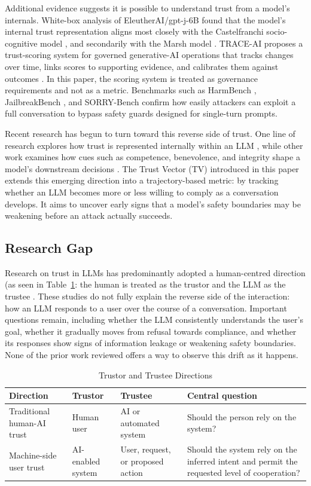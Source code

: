 \documentclass[conference]{IEEEtran}
\begin{document}
Additional evidence suggests it is possible to understand trust from a model's internals. White-box analysis of EleutherAI/gpt-j-6B found that the model's internal trust representation aligns most closely with the Castelfranchi socio-cognitive model \cite{ref58}, and secondarily with the Marsh model \cite{ref27}. TRACE-AI proposes a trust-scoring system for governed generative-AI operations that tracks changes over time, links scores to supporting evidence, and calibrates them against outcomes \cite{ref22}. In this paper, the scoring system is treated as governance requirements and not as a metric. Benchmarks such as HarmBench \cite{ref18}, JailbreakBench \cite{ref19}, and SORRY-Bench \cite{ref20} confirm how easily attackers can exploit a full conversation to bypass safety guards designed for single-turn prompts. 

Recent research has begun to turn toward this reverse side of trust. One line of research explores how trust is represented internally within an LLM \cite{ref21}, while other work examines how cues such as competence, benevolence, and integrity shape a model's downstream decisions \cite{ref23}. The Trust Vector (TV) introduced in this paper extends this emerging direction into a trajectory-based metric: by tracking whether an LLM becomes more or less willing to comply as a conversation develops. It aims to uncover early signs that a model's safety boundaries may be weakening before an attack actually succeeds.

\subsection{Research Gap}
Research on trust in LLMs has predominantly adopted a human-centred direction (as seen in Table~\ref{tab:trustor}: the human is treated as the trustor and the LLM as the trustee \cite{ref29} \cite{ref57}. These studies do not fully explain the reverse side of the interaction: how an LLM responds to a user over the course of a conversation. Important questions remain, including whether the LLM consistently understands the user’s goal, whether it gradually moves from refusal towards compliance, and whether its responses show signs of information leakage or weakening safety boundaries. None of the prior work reviewed offers a way to observe this drift as it happens. 

\begin{table}[htbp]
\centering
\caption{Trustor and Trustee Directions}
\begin{tabularx}{\linewidth}{X X X X}
\toprule
\textbf{Direction} & \textbf{Trustor} & \textbf{Trustee} & \textbf{Central question} \\
\midrule
Traditional human-AI trust & Human user & AI or automated system & Should the person rely on the system? \\
Machine-side user trust & AI-enabled system & User, request, or proposed action & Should the system rely on the inferred intent and permit the requested level of cooperation? \\
\bottomrule
\end{tabularx}
 \label{tab:trustor} 
\end{table}
\end{document}
